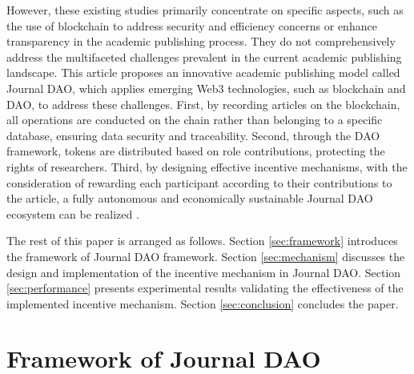 \documentclass[lettersize,journal]{IEEEtran}
\begin{document}
However, these existing studies primarily concentrate on specific aspects, such as the use of blockchain to address security and efficiency concerns or enhance transparency in the academic publishing process. They do not comprehensively address the multifaceted challenges prevalent in the current academic publishing landscape. This article proposes an innovative academic publishing model called Journal DAO, which applies emerging Web3 technologies, such as blockchain and DAO, to address these challenges. First, by recording articles on the blockchain, all operations are conducted on the chain rather than belonging to a specific database, ensuring data security and traceability. Second, through the DAO framework, tokens are distributed based on role contributions, protecting the rights of researchers. Third, by designing effective incentive mechanisms, with the consideration of rewarding each participant according to their contributions to the article, a fully autonomous and economically sustainable Journal DAO ecosystem can be realized \cite{ding2022desci}.

The rest of this paper is arranged as follows. Section \ref{sec:framework} introduces the framework of Journal DAO framework. Section \ref{sec:mechanism} discusses the design and implementation of the incentive mechanism in Journal DAO. Section \ref{sec:performance} presents experimental results validating the effectiveness of the implemented incentive mechanism.
Section \ref{sec:conclusion} concludes the paper.


\section{Framework of Journal DAO \label{sec:framework}}








\end{document}
